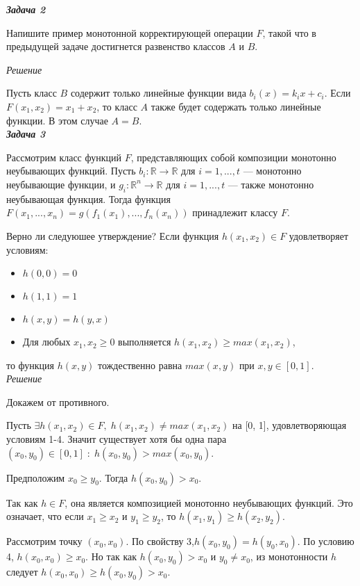 \textbf{\emph{Задача 2}}

Напишите пример монотонной корректирующей операции $F$, такой что в предыдущей задаче достигнется развенство классов $A$ и $B$.


\textit{Решение}

Пусть класс $B$ содержит только линейные функции вида $b_i(x) = k_i x + c_i$. Если $F(x_1, x_2) = x_1 + x_2$, то класс $A$ также будет содержать только линейные функции. В этом случае $A = B$.\\

\textbf{\emph{Задача 3}}

Рассмотрим класс функций $F$, представляющих собой композиции монотонно неубывающих функций. Пусть $b_i: \mathbb{R} \rightarrow \mathbb{R}$ для $i = 1, ..., t$ — монотонно неубывающие функции, и $g_i: \mathbb{R}^n \rightarrow \mathbb{R}$ для $i = 1, ..., t$ — также монотонно неубывающая функция. Тогда функция $F(x_1, ..., x_n) = g(f_1(x_1), ..., f_n(x_n))$ принадлежит классу $F$.

Верно ли следуюшее утверждение? Если функция $h(x_1, x_2) \in F$ удовлетворяет условиям:

\begin{itemize}
    \item $h(0, 0) = 0$
    \item $h(1, 1) = 1$
    \item $h(x, y) = h(y, x)$
    \item Для любых $x_1, x_2 \geq 0$ выполняется $h(x_1, x_2) \geq max(x_1, x_2)$,

\end{itemize}


то функция $h(x, y)$ тождественно равна $max(x, y)$ при $x, y \in [0, 1]$.\\

\textit{Решение}

Докажем от противного.

Пусть $\exists h(x_1, x_2) \in F, \; h(x_1, x_2) \neq max(x_1, x_2)$ на [0, 1], удовлетворяющая условиям 1-4.  Значит существует хотя бы одна пара $(x_0, y_0) \in [0, 1] \; : \; h(x_0, y_0)> max(x_0, y_0)$.

Предположим $x_0 \geq y_0$. Тогда $h(x_0, y_0) > x_0$.

Так как $h \in F$,  она является композицией монотонно неубывающих функций.  Это означает, что если $x_1 \geq x_2$ и $y_1 \geq y_2$, то $h(x_1, y_1) \geq h(x_2, y_2)$.

Рассмотрим точку $(x_0, x_0)$.  По свойству 3,$ h(x_0, y_0) = h(y_0, x_0)$.  По условию 4, $h(x_0, x_0) \geq x_0$.  Но так как $h(x_0, y_0) > x_0$ и $y_0 \neq x_0$,  из монотонности $h$ следует   $h(x_0, x_0) \geq h(x_0, y_0) > x_0$.

